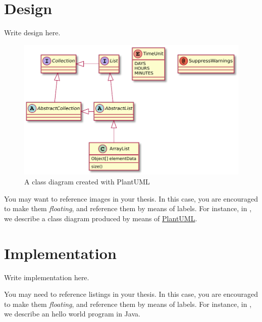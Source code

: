 \documentclass[12pt,a4paper,openright,twoside]{book}
\begin{document}

%

\chapter{Design} %
\label{chap:design}

Write design here.

\begin{figure}
	\centering
	\includegraphics[width=0.5\linewidth]{figures/classes.pdf}
	\caption{A class diagram created with PlantUML}
	\label{fig:classes}
\end{figure}

You may want to reference images in your thesis.
%
In this case, you are encouraged to make them \emph{floating}, and reference them by means of labels.
%
For instance, in , we describe a class diagram produced by means of \href{http://plantuml.com}{PlantUML}.

\chapter{Implementation} %
\label{chap:implementation}

Write implementation here.



You may need to reference listings in your thesis.
%
In this case, you are encouraged to make them \emph{floating}, and reference them by means of labels.
%
For instance, in , we describe an hello world program in Java.
\end{document}
